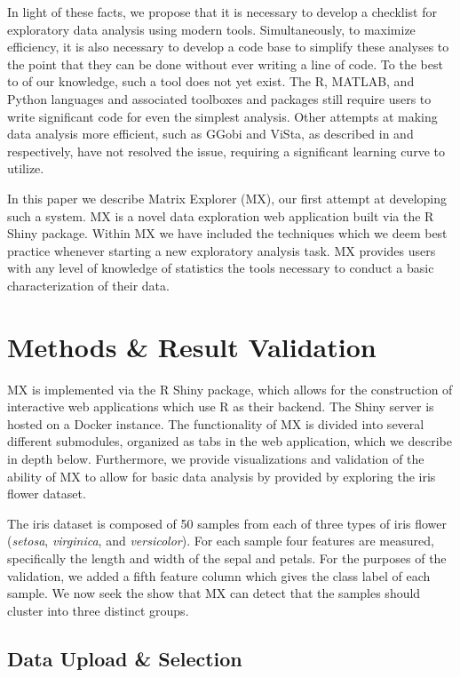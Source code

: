 \documentclass[review]{siamart0516}
\begin{document}
In light of these facts, we propose that it is necessary to develop a checklist for exploratory data analysis using modern tools. Simultaneously, to maximize efficiency, it is also necessary to develop a code base to simplify these analyses to the point that they can be done without ever writing a line of code. To the best to of our knowledge, such a tool does not yet exist. The R, MATLAB, and Python languages and associated toolboxes and packages still require users to write significant code for even the simplest analysis. Other attempts at making data analysis more efficient, such as GGobi and ViSta, as described in \cite{swayne2003ggobi} and \cite{valero2011using} respectively, have not resolved the issue, requiring a significant learning curve to utilize.

In this paper we describe Matrix Explorer (MX), our first attempt at developing such a system. MX is a novel data exploration web application built via the R Shiny package. Within MX we have included the techniques which we deem best practice whenever starting a new exploratory analysis task. MX provides users with any level of knowledge of statistics the tools necessary to conduct a basic characterization of their data.

\section{Methods \& Result Validation}
\label{sec:meth}

MX is implemented via the R Shiny package, which allows for the construction of interactive web applications which use R as their backend. The Shiny server is hosted on a Docker instance. The functionality of MX is divided into several different submodules, organized as tabs in the web application, which we  describe in depth below. Furthermore, we provide visualizations and validation of the ability of MX to allow for basic data analysis by provided by exploring the iris flower dataset. 

The iris dataset is composed of 50 samples from each of three types of iris flower (\textit{setosa}, \textit{virginica}, and \textit{versicolor}). For each sample four features are measured, specifically the length and width of the sepal and petals. For the purposes of the validation, we added a fifth feature column which gives the class label of each sample. We now seek the show that MX can detect that the samples should cluster into three distinct groups.

\subsection{Data Upload \& Selection}
\label{subsec:SubSecUpload}
\end{document}
